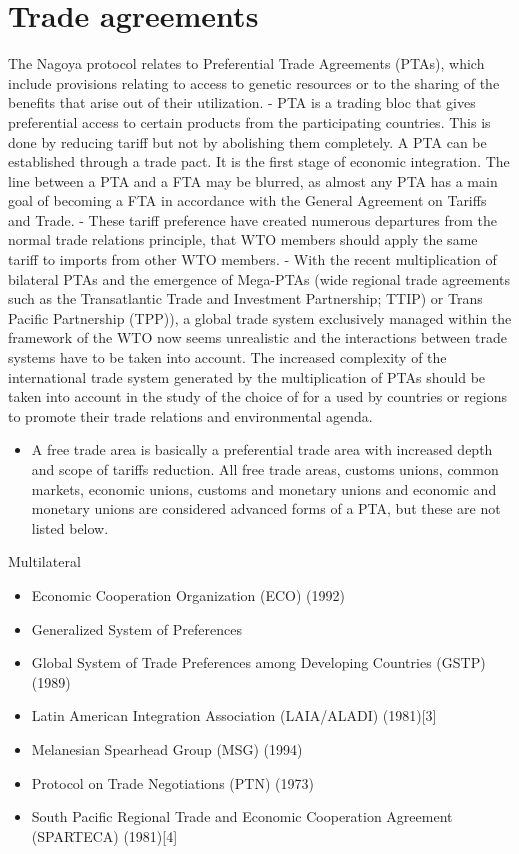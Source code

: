 \documentclass[]{book}
\providecommand{\tightlist}{%
  \setlength{\itemsep}{0pt}\setlength{\parskip}{0pt}}
\begin{document}
\hypertarget{trade-agreements}{%
\section{Trade agreements}\label{trade-agreements}}

The Nagoya protocol relates to Preferential Trade Agreements (PTAs), which include provisions relating to access to genetic resources or to the sharing of the benefits that arise out of their utilization.
- PTA is a trading bloc that gives preferential access to certain products from the participating countries. This is done by reducing tariff but not by abolishing them completely. A PTA can be established through a trade pact. It is the first stage of economic integration. The line between a PTA and a FTA may be blurred, as almost any PTA has a main goal of becoming a FTA in accordance with the General Agreement on Tariffs and Trade.
- These tariff preference have created numerous departures from the normal trade relations principle, that WTO members should apply the same tariff to imports from other WTO members.
- With the recent multiplication of bilateral PTAs and the emergence of Mega-PTAs (wide regional trade agreements such as the Transatlantic Trade and Investment Partnership; TTIP) or Trans Pacific Partnership (TPP)), a global trade system exclusively managed within the framework of the WTO now seems unrealistic and the interactions between trade systems have to be taken into account. The increased complexity of the international trade system generated by the multiplication of PTAs should be taken into account in the study of the choice of for a used by countries or regions to promote their trade relations and environmental agenda.

\begin{itemize}
\tightlist
\item
  A free trade area is basically a preferential trade area with increased depth and scope of tariffs reduction. All free trade areas, customs unions, common markets, economic unions, customs and monetary unions and economic and monetary unions are considered advanced forms of a PTA, but these are not listed below.
\end{itemize}

Multilateral

\begin{itemize}
\tightlist
\item
  Economic Cooperation Organization (ECO) (1992)
\item
  Generalized System of Preferences
\item
  Global System of Trade Preferences among Developing Countries (GSTP) (1989)
\item
  Latin American Integration Association (LAIA/ALADI) (1981){[}3{]}
\item
  Melanesian Spearhead Group (MSG) (1994)
\item
  Protocol on Trade Negotiations (PTN) (1973)
\item
  South Pacific Regional Trade and Economic Cooperation Agreement (SPARTECA) (1981){[}4{]}
\end{itemize}
\end{document}
